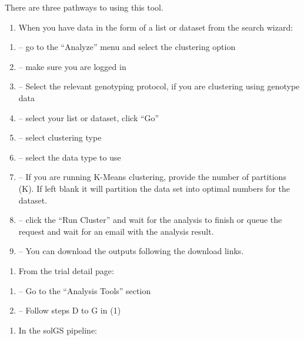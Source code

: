 \documentclass[
  12pt,
]{book}
\providecommand{\tightlist}{%
  \setlength{\itemsep}{0pt}\setlength{\parskip}{0pt}}
\begin{document}
There are three pathways to using this tool.

\begin{enumerate}
\def\labelenumi{(\arabic{enumi})}
\tightlist
\item
  When you have data in the form of a list or dataset from the search wizard:
\end{enumerate}

\begin{enumerate}
\def\labelenumi{(\Alph{enumi})}
\item
  -- go to the ``Analyze'' menu and select the clustering option
\item
  -- make sure you are logged in
\item
  -- Select the relevant genotyping protocol, if you are clustering using genotype data
\item
  -- select your list or dataset, click ``Go''
\item
  -- select clustering type
\item
  -- select the data type to use
\item
  -- If you are running K-Means clustering, provide the number of partitions (K). If left blank it will partition the data set into optimal numbers for the dataset.
\item
  -- click the ``Run Cluster'' and wait for the analysis to finish or queue the request and wait for an email with the analysis result.
\item
  -- You can download the outputs following the download links.
\end{enumerate}

\begin{enumerate}
\def\labelenumi{(\arabic{enumi})}
\setcounter{enumi}{1}
\tightlist
\item
  From the trial detail page:
\end{enumerate}

\begin{enumerate}
\def\labelenumi{(\Alph{enumi})}
\item
  -- Go to the ``Analysis Tools'' section
\item
  -- Follow steps D to G in (1)
\end{enumerate}

\begin{enumerate}
\def\labelenumi{(\arabic{enumi})}
\setcounter{enumi}{2}
\tightlist
\item
  In the solGS pipeline:
\end{enumerate}
\end{document}
